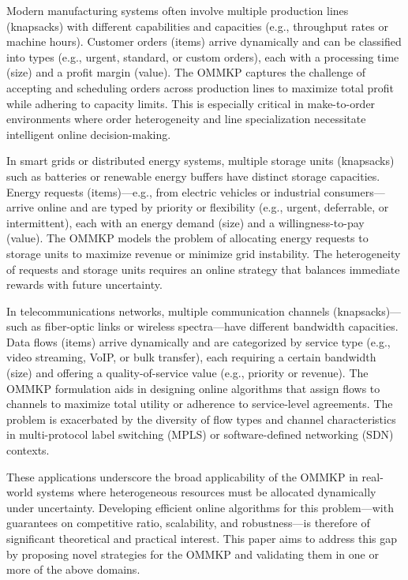 Modern manufacturing systems often involve multiple production lines (knapsacks) with different capabilities and capacities (e.g., throughput rates or machine hours). Customer orders (items) arrive dynamically and can be classified into types (e.g., urgent, standard, or custom orders), each with a processing time (size) and a profit margin (value). The OMMKP captures the challenge of accepting and scheduling orders across production lines to maximize total profit while adhering to capacity limits. This is especially critical in make-to-order environments where order heterogeneity and line specialization necessitate intelligent online decision-making.


In smart grids or distributed energy systems, multiple storage units (knapsacks) such as batteries or renewable energy buffers have distinct storage capacities. Energy requests (items)—e.g., from electric vehicles or industrial consumers—arrive online and are typed by priority or flexibility (e.g., urgent, deferrable, or intermittent), each with an energy demand (size) and a willingness-to-pay (value). The OMMKP models the problem of allocating energy requests to storage units to maximize revenue or minimize grid instability. The heterogeneity of requests and storage units requires an online strategy that balances immediate rewards with future uncertainty.

In telecommunications networks, multiple communication channels (knapsacks)—such as fiber-optic links or wireless spectra—have different bandwidth capacities. Data flows (items) arrive dynamically and are categorized by service type (e.g., video streaming, VoIP, or bulk transfer), each requiring a certain bandwidth (size) and offering a quality-of-service value (e.g., priority or revenue). The OMMKP formulation aids in designing online algorithms that assign flows to channels to maximize total utility or adherence to service-level agreements. The problem is exacerbated by the diversity of flow types and channel characteristics in multi-protocol label switching (MPLS) or software-defined networking (SDN) contexts.


These applications underscore the broad applicability of the OMMKP in real-world systems where heterogeneous resources must be allocated dynamically under uncertainty. Developing efficient online algorithms for this problem—with guarantees on competitive ratio, scalability, and robustness—is therefore of significant theoretical and practical interest. This paper aims to address this gap by proposing novel strategies for the OMMKP and validating them in one or more of the above domains.


